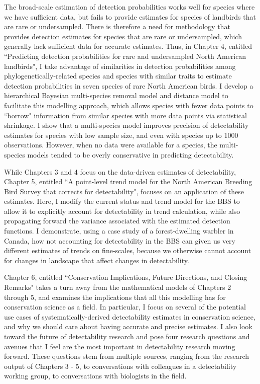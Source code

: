 \par The broad-scale estimation of detection probabilities works well for species where we have sufficient data, but fails to provide estimates for species of landbirds that are rare or undersampled.
There is therefore a need for methodology that provides detection estimates for species that are rare or undersampled, which generally lack sufficient data for accurate estimates. 
Thus, in Chapter 4, entitled ``Predicting detection probabilities for rare and undersampled North American landbirds", I take advantage of similarities in detection probabilities among phylogenetically-related species and species with similar traits to estimate detection probabilities in seven species of rare North American birds.
I develop a hierarchical Bayesian multi-species removal model and distance model to facilitate this modelling approach, which allows species with fewer data points to ``borrow" information from similar species with more data points via statistical shrinkage. 
I show that a multi-species model improves precision of detectability estimates for species with low sample size, and even with species up to 1000 observations.
However, when no data were available for a species, the multi-species models tended to be overly conservative in predicting detectability. 

\par While Chapters 3 and 4 focus on the data-driven estimates of detectability, Chapter 5, entitled ``A point-level trend model for the North American Breeding Bird Survey that corrects for detectability", focuses on an application of these estimates.
Here, I modify the current status and trend model for the BBS \citep{smith_spatially_2023} to allow it to explicitly account for detectability in trend calculation, while also propagating forward the variance associated with the estimated detection functions.
I demonstrate, using a case study of a forest-dwelling warbler in Canada, how not accounting for detectability in the BBS can given us very different estimates of trends on fine-scales, because we otherwise cannot account for changes in landscape that affect changes in detectability.

\par Chapter 6, entitled ``Conservation Implications, Future Directions, and Closing Remarks" takes a turn away from the mathematical models of Chapters 2 through 5, and examines the implications that all this modelling has for conservation science as a field.
In particular, I focus on several of the potential use cases of systematically-derived detectability estimates in conservation science, and why we should care about having accurate and precise estimates.
I also look toward the future of detectability research and pose four research questions and avenues that I feel are the most important in detectability research moving forward.
These questions stem from multiple sources, ranging from the research output of Chapters 3 - 5, to conversations with colleagues in a detectability working group, to conversations with biologists in the field.
